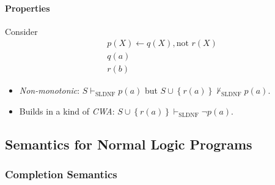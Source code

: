 \documentclass[twocolumn,english]{article}
\begin{document}
\paragraph{Properties}

Consider
\begin{align*}
 & p\left(X\right)\leftarrow q\left(X\right),\text{not }r\left(X\right)\\
 & q\left(a\right)\\
 & r\left(b\right)
\end{align*}
\begin{itemize}
\item \emph{Non-monotonic}: $S\vdash_{\text{SLDNF}}p\left(a\right)$ but
$S\cup\left\{ r\left(a\right)\right\} \not\vdash_{\text{SLDNF}}p\left(a\right)$.
\item Builds in a kind of \emph{CWA}: $S\cup\left\{ r\left(a\right)\right\} \vdash_{\text{SLDNF}}\lnot p\left(a\right)$.
\end{itemize}

\subsection{Semantics for Normal Logic Programs}

\subsubsection{Completion Semantics}
\end{document}
